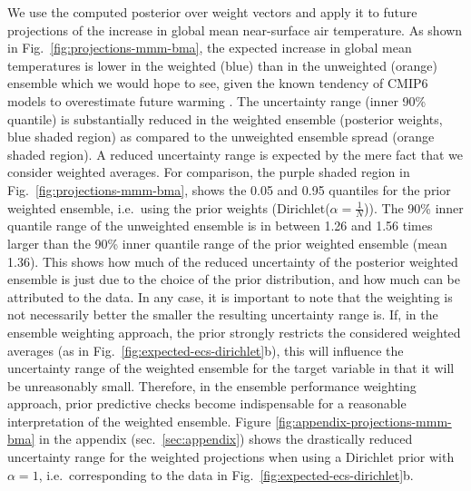 We use the computed posterior over weight vectors and apply it to future projections of the increase in global mean near-surface air temperature. 
%
As shown in Fig.~\ref{fig:projections-mmm-bma}, the expected increase in global mean temperatures is lower in the weighted (blue) than in the unweighted (orange) ensemble which we would hope to see, given the known tendency of CMIP6 models to overestimate future warming \citep[e.g.~][]{tokarskaWarmingTrendConstrains2020,hausfatherClimateSimulationsRecognize2022}.
The uncertainty range (inner 90\% quantile) is substantially reduced in the weighted ensemble (posterior weights, blue shaded region) as compared to the unweighted ensemble spread (orange shaded region).
A reduced uncertainty range is expected by the mere fact that we consider weighted averages. 
For comparison, the purple shaded region in Fig.~\ref{fig:projections-mmm-bma}, shows the 0.05 and 0.95 quantiles for the prior weighted ensemble, i.e.~using the prior weights (Dirichlet($\alpha = \frac{1}{N}$)). The 90\% inner quantile range of the unweighted ensemble is in between 1.26 and 1.56 times larger than the 90\% inner quantile range of the prior weighted ensemble (mean 1.36). 
This shows how much of the reduced uncertainty of the posterior weighted ensemble is just due to the choice of the prior distribution, and how much can be attributed to the data.
In any case, it is important to note that the weighting is not necessarily better the smaller the resulting uncertainty range is.
If, in the ensemble weighting approach, the prior strongly restricts the considered weighted averages (as in Fig.~\ref{fig:expected-ecs-dirichlet}b), this will influence the uncertainty range of the weighted ensemble for the target variable in that it will be unreasonably small. Therefore, in the ensemble performance weighting approach, prior predictive checks become indispensable for a reasonable interpretation of the weighted ensemble. Figure \ref{fig:appendix-projections-mmm-bma} in the appendix (sec.~\ref{sec:appendix}) shows the drastically reduced uncertainty range for the weighted projections when using a Dirichlet prior with $\alpha=1$, i.e.~corresponding to the data in Fig.~\ref{fig:expected-ecs-dirichlet}b. 

